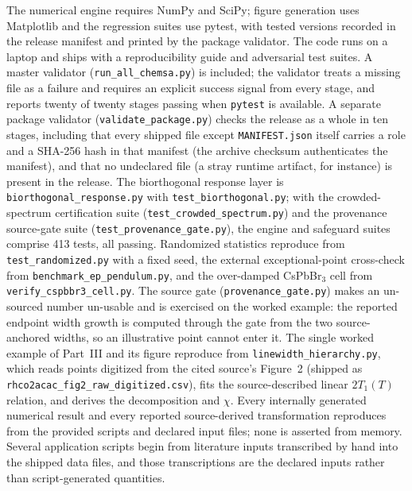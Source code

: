 The numerical engine requires NumPy and SciPy; figure generation uses Matplotlib and the regression suites use pytest, with tested versions recorded in the release manifest and printed by the package validator. The code runs on a laptop and ships with a reproducibility guide and adversarial test suites. A master validator (\texttt{run\_all\_chemsa.py}) is included; the validator treats a missing file as a failure and requires an explicit success signal from every stage, and reports twenty of twenty stages passing when \texttt{pytest} is available. A separate package validator (\texttt{validate\_package.py}) checks the release as a whole in ten stages, including that every shipped file except \texttt{MANIFEST.json} itself carries a role and a SHA-256 hash in that manifest (the archive checksum authenticates the manifest), and that no undeclared file (a stray runtime artifact, for instance) is present in the release. The biorthogonal response layer is \texttt{biorthogonal\_response.py} with \texttt{test\_biorthogonal.py}; with the crowded-spectrum certification suite (\texttt{test\_crowded\_spectrum.py}) and the provenance source-gate suite (\texttt{test\_provenance\_gate.py}), the engine and safeguard suites comprise 413 tests, all passing. Randomized statistics reproduce from \texttt{test\_randomized.py} with a fixed seed, the external exceptional-point cross-check from \texttt{benchmark\_ep\_pendulum.py}, and the over-damped CsPbBr\(_3\) cell from \texttt{verify\_cspbbr3\_cell.py}. The source gate (\texttt{provenance\_gate.py}) makes an un-sourced number un-usable and is exercised on the worked example: the reported endpoint width growth is computed through the gate from the two source-anchored widths, so an illustrative point cannot enter it. The single worked example of Part~III and its figure reproduce from \texttt{linewidth\_hierarchy.py}, which reads points digitized from the cited source's Figure~2 (shipped as \texttt{rhco2acac\_fig2\_raw\_digitized.csv}), fits the source-described linear $2T_1(T)$ relation, and derives the decomposition and $\chi$. Every internally generated numerical result and every reported source-derived transformation reproduces from the provided scripts and declared input files; none is asserted from memory. Several application scripts begin from literature inputs transcribed by hand into the shipped data files, and those transcriptions are the declared inputs rather than script-generated quantities.
